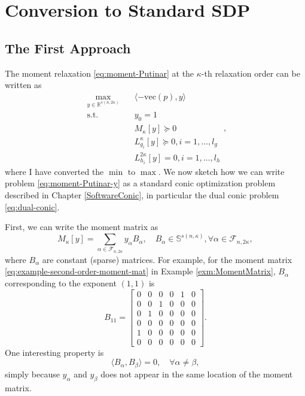 \documentclass[
]{book}
\theoremstyle{definition}
\theoremstyle{definition}
\theoremstyle{definition}
\theoremstyle{definition}
\theoremstyle{remark}
\begin{document}
\section{Conversion to Standard SDP}\label{conversion-to-standard-sdp}

\subsection{The First Approach}\label{the-first-approach}

The moment relaxation \eqref{eq:moment-Putinar} at the \(\kappa\)-th relaxation order can be written as
\begin{equation}
\begin{split}
\max_{y \in \mathbb{R}^{s(n,2\kappa)}} & \quad \langle - \mathrm{vec}(p), y \rangle \\
\mathrm{s.t.}& \quad y_0 = 1 \\
& \quad M_\kappa[y] \succeq 0 \\
& \quad L_{g_i}^{\kappa}[y] \succeq 0, i=1,\dots,l_g \\
& \quad L_{h_i}^{2\kappa}[y] = 0, i=1,\dots,l_h
\end{split},
\label{eq:moment-Putinar-y}
\end{equation}
where I have converted the \(\min\) to \(\max\). We now sketch how we can write problem \eqref{eq:moment-Putinar-y} as a standard conic optimization problem described in Chapter \ref{SoftwareConic}, in particular the dual conic problem \eqref{eq:dual-conic}.

First, we can write the moment matrix as
\[
M_{\kappa}[y] = \sum_{\alpha \in \mathcal{F}_{n,2\kappa}} y_\alpha B_{\alpha}, \quad B_{\alpha} \in \mathbb{S}^{s(n,\kappa)}, \forall \alpha \in \mathcal{F}_{n,2\kappa},
\]
where \(B_\alpha\) are constant (sparse) matrices. For example, for the moment matrix \eqref{eq:example-second-order-moment-mat} in Example \ref{exm:MomentMatrix}, \(B_\alpha\) corresponding to the exponent \((1,1)\) is
\[
B_{11} = \begin{bmatrix}
0 & 0 & 0 & 0 & 1 & 0 \\
0 & 0 & 1 & 0 & 0 & 0 \\
0 & 1 & 0 & 0 & 0 & 0 \\
0 & 0 & 0 & 0 & 0 & 0 \\
1 & 0 & 0 & 0 & 0 & 0 \\
0 & 0 & 0 & 0 & 0 & 0
\end{bmatrix}.
\]
One interesting property is
\[
\langle B_\alpha, B_\beta \rangle = 0, \quad \forall \alpha \neq \beta,
\]
simply because \(y_\alpha\) and \(y_\beta\) does not appear in the same location of the moment matrix.
\end{document}
